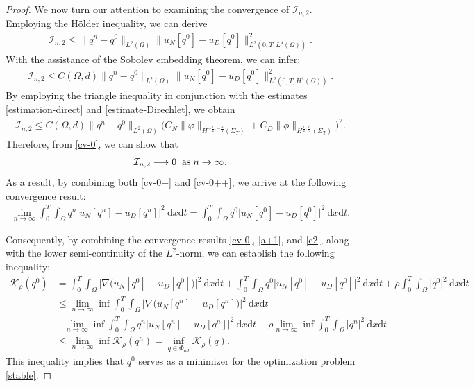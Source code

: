 \documentclass[a4paper,12pt,reqno,natbib]{amsart}
\newcommand{\dx} {\displaystyle\mathrm{d}x}
\newcommand{\dt} {\displaystyle\mathrm{d}t}
\begin{document}
\begin{proof}
We now turn our attention to examining the convergence of $\mathcal{I}_{n,2}$. Employing the H\"older inequality, we can derive
\begin{align*}
    \mathcal{I}_{n,2} \leq \|q^n-q^0\|_{L^2(\Omega)}\|u_N[q^0]- u_D[q^0]\|^2_{L^2(0,T;L^4(\Omega))}.
\end{align*}
With the assistance of the Sobolev embedding theorem, we can infer:
\begin{align*} 
 \mathcal{I}_{n,2} \leq C(\Omega,d)\|q^n-q^0\|_{L^2(\Omega)}\|u_N[q^0]- u_D[q^0]\|^2_{L^2(0,T;H^1(\Omega))}.
\end{align*}
By employing the triangle inequality in conjunction with the estimates \eqref{estimation-direct} and \eqref{estimate-Direchlet}, we obtain
\begin{align*} 
     \mathcal{I}_{n,2} \leq C(\Omega,d)\|q^n-q^0\|_{L^2(\Omega)}\Big(C_N\|\varphi\|_{H^{-\frac{1}{2},-\frac{\alpha}{4} }(\Sigma_{T})} + C_D\|\phi\|_{H^{\frac{1}{2},\frac{\alpha}{4} }(\Sigma_{T})}\Big)^2.
\end{align*}
Therefore, from \eqref{cv-0}, we can show that
\begin{align} \label{cv-0++}
    \mathcal{I}_{n,2} \longrightarrow  0 \;\; \hbox{as}\; n\rightarrow\infty.
\end{align}
As a result, by combining both \eqref{cv-0+} and \eqref{cv-0++}, we arrive at the following convergence result:
\begin{align} \label{c2}
    \lim_{n\rightarrow\infty} \int_0^T \int_{\Omega}q^n\Big|
 u_N[q^n]- u_D[q^n]\Big|^2\ \dx \dt = \int_0^T \int_{\Omega}q^0\Big|
 u_N[q^0]- u_D[q^0]\Big|^2\ \dx \dt.
\end{align}

Consequently, by combining the convergence results \eqref{cv-0}, \eqref{a+1}, and \eqref{c2}, along with the lower semi-continuity of the $L^2$-norm, we can establish the following inequality:
\begin{align*}
\mathcal{K}_\rho(q^0) &=\int_0^T \int_{\Omega}\Big|\nabla\Big(
 u_N[q^0]- u_D[q^0]\Big)\Big|^2\ \dx \dt + \int_0^T \int_{\Omega}q^0\Big|
 u_N[q^0]- u_D[q^0]\Big|^2\ \dx\dt+\rho\int_0^T \int_{\Omega}\Big|q^0\Big|^2\ \dx\dt\\
&\leq\lim_{n\rightarrow\infty}\inf\int_0^T \int_{\Omega}\Big|\nabla\Big(
 u_N[q^n]- u_D[q^n]\Big)\Big|^2\ \dx \dt \qquad\qquad\\
&+ \lim_{n\rightarrow\infty}\inf\int_0^T \int_{\Omega}q^n\Big|
 u_N[q^n]- u_D[q^n]\Big|^2\ \dx\dt+ \rho\lim_{n\rightarrow\infty}\inf\int_0^T \int_{\Omega}\Big|q^n\Big|^2\ \dx\dt\\
&\leq\lim_{n\rightarrow\infty}\inf\mathcal{K}_\rho(q^n)=\inf_{q\in\Phi_{ad}}\mathcal{K}_\rho(q).
\end{align*}
This inequality implies that $q^0$ serves as a minimizer for the optimization problem \eqref{stable}.
\end{proof}
\end{document}
